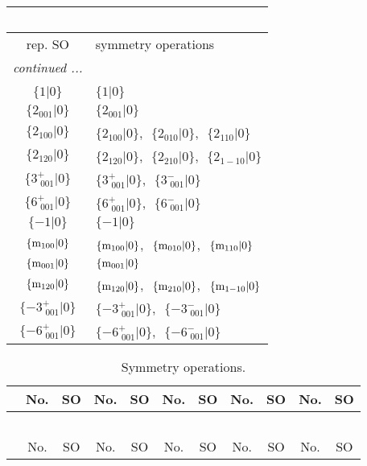 \documentclass[fleqn,10pt,landscape]{article}
\begin{document}
\begin{itemize}
\begin{center}
\begin{longtable}{c|l}
\multicolumn{1}{l}{\tablename\ \thetable{}} \\
 \hline \hline
rep. SO & symmetry operations \\ \hline \endhead

 \hline \hline
\multicolumn{1}{r}{\footnotesize\it continued ...} \\ \endfoot

 \hline \hline
\multicolumn{1}{r}{} \\ \endlastfoot

$\{1|0\}$ & $\{1|0\}$ \\ \hline
$\{2{}_{001}|0\}$ & $\{2{}_{001}|0\}$ \\ \hline
$\{2{}_{100}|0\}$ & $\{2{}_{100}|0\}$,\,\, $\{2{}_{010}|0\}$,\,\, $\{2{}_{110}|0\}$ \\ \hline
$\{2{}_{120}|0\}$ & $\{2{}_{120}|0\}$,\,\, $\{2{}_{210}|0\}$,\,\, $\{2{}_{1-10}|0\}$ \\ \hline
$\{3^{+}_{\,\,001}|0\}$ & $\{3^{+}_{\,\,001}|0\}$,\,\, $\{3^{-}_{\,\,001}|0\}$ \\ \hline
$\{6^{+}_{\,\,001}|0\}$ & $\{6^{+}_{\,\,001}|0\}$,\,\, $\{6^{-}_{\,\,001}|0\}$ \\ \hline
$\{-1|0\}$ & $\{-1|0\}$ \\ \hline
$\{{\rm m}_{100}|0\}$ & $\{{\rm m}_{100}|0\}$,\,\, $\{{\rm m}_{010}|0\}$,\,\, $\{{\rm m}_{110}|0\}$ \\ \hline
$\{{\rm m}_{001}|0\}$ & $\{{\rm m}_{001}|0\}$ \\ \hline
$\{{\rm m}_{120}|0\}$ & $\{{\rm m}_{120}|0\}$,\,\, $\{{\rm m}_{210}|0\}$,\,\, $\{{\rm m}_{1-10}|0\}$ \\ \hline
$\{-3^{+}_{\,\,001}|0\}$ & $\{-3^{+}_{\,\,001}|0\}$,\,\, $\{-3^{-}_{\,\,001}|0\}$ \\ \hline
$\{-6^{+}_{\,\,001}|0\}$ & $\{-6^{+}_{\,\,001}|0\}$,\,\, $\{-6^{-}_{\,\,001}|0\}$ \\
\end{longtable}
\end{center}
\begin{center}
\renewcommand{\arraystretch}{1.3}
\begin{longtable}{c|cc|cc|cc|cc|cc}
\caption{Symmetry operations.}
 \\
 \hline \hline
 & No. & SO & No. & SO & No. & SO & No. & SO & No. & SO \\ \hline \endfirsthead

\multicolumn{10}{l}{\tablename\ \thetable{}} \\
 \hline \hline
 & No. & SO & No. & SO & No. & SO & No. & SO & No. & SO \\ \hline \endhead


\end{longtable}
\end{center}
\end{itemize}
\end{document}
